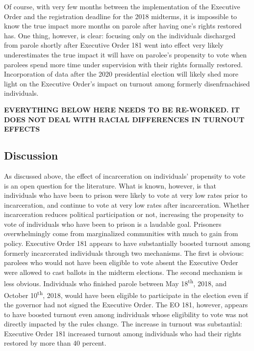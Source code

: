\documentclass[]{article}
\begin{document}
Of course, with very few months between the implementation of the Executive Order and the registration deadline for the 2018 midterms, it is impossible to know the true impact more months on parole after having one's rights restored has. One thing, however, is clear: focusing only on the individuals discharged from parole shortly after Executive Order 181 went into effect very likely underestimates the true impact it will have on parolee's propensity to vote when parolees spend more time under supervision with their rights formally restored. Incorporation of data after the 2020 presidential election will likely shed more light on the Executive Order's impact on turnout among formerly disenfrnachised individuals.

\textbf{EVERYTHING BELOW HERE NEEDS TO BE RE-WORKED. IT DOES NOT DEAL WITH RACIAL DIFFERENCES IN TURNOUT EFFECTS}

\hypertarget{discussion-1}{%
\subsection*{Discussion}\label{discussion-1}}

As discussed above, the effect of incarceration on individuals' propensity to vote is an open question for the literature. What is known, however, is that individuals who have been to prison were likely to vote at very low rates prior to incarceration, and continue to vote at very low rates after incarceration. Whether incarceration reduces political participation or not, increasing the propensity to vote of individuals who have been to prison is a laudable goal. Prisoners overwhelmingly come from marginalized communities with much to gain from policy. Executive Order 181 appears to have substantially boosted turnout among formerly incarcerated individuals through two mechanisms. The first is obvious: parolees who would not have been eligible to vote absent the Executive Order were allowed to cast ballots in the midterm elections. The second mechanism is less obvious. Individuals who finished parole between May 18\textsuperscript{th}, 2018, and October 10\textsuperscript{th}, 2018, would have been eligible to participate in the election even if the governor had not signed the Executive Order. The EO 181, however, appears to have boosted turnout even among individuals whose eligibility to vote was not directly impacted by the rules change. The increase in turnout was substantial: Executive Order 181 increased turnout among individuals who had their rights restored by more than 40 percent.
\end{document}
